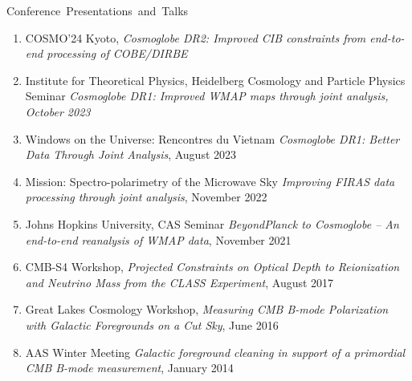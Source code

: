 \documentclass[a4paper]{resume}
\begin{document}
\begin{category}{\mbox{Conference Presentations and Talks}}
\citemnobullet
\noindent
\begin{enumerate}[topsep=0pt,itemsep=0pt,partopsep=0pt,parsep=0pt]
	\item COSMO'24 Kyoto, \textit{Cosmoglobe DR2: Improved CIB constraints from end-to-end processing of COBE/DIRBE}
\item Institute for Theoretical Physics, Heidelberg Cosmology and Particle Physics Seminar
	\textit{Cosmoglobe DR1: Improved WMAP maps through joint analysis, October 2023}
\item Windows on the Universe: Rencontres du Vietnam
	\textit{Cosmoglobe DR1: Better Data Through Joint Analysis}, August 2023
\item Mission: Spectro-polarimetry of the Microwave Sky
	\textit{Improving FIRAS data processing through joint analysis}, November 2022 \item Johns Hopkins University, CAS Seminar \textit{BeyondPlanck to Cosmoglobe -- An end-to-end
	reanalysis of WMAP data}, November 2021
\item CMB-S4 Workshop, \emph{Projected Constraints on Optical Depth to Reionization and Neutrino Mass from the CLASS Experiment}, August 2017
\item Great Lakes Cosmology Workshop, \emph{Measuring CMB B-mode Polarization
    with Galactic Foregrounds on a Cut Sky}, June 2016
\item AAS Winter Meeting 
    \emph{Galactic foreground cleaning in support of a primordial CMB B-mode measurement}, January 2014
\end{enumerate}
\end{category}

\end{document}
